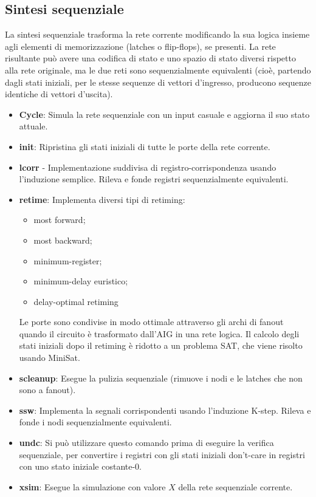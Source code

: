 \documentclass[
  italian,
]{book}
\providecommand{\tightlist}{%
  \setlength{\itemsep}{0pt}\setlength{\parskip}{0pt}}
\begin{document}
\newpage

\hypertarget{sintesi-sequenziale}{%
\subsection{Sintesi sequenziale}\label{sintesi-sequenziale}}

La sintesi sequenziale trasforma la rete corrente modificando la sua logica insieme agli elementi di memorizzazione (latches o flip-flops), se presenti. La rete risultante può avere una codifica di stato e uno spazio di stato diversi rispetto alla rete originale, ma le due reti sono sequenzialmente equivalenti (cioè, partendo dagli stati iniziali, per le stesse sequenze di vettori d'ingresso, producono sequenze identiche di vettori d'uscita).

\begin{itemize}
\tightlist
\item
  \textbf{Cycle}: Simula la rete sequenziale con un input casuale e aggiorna il suo stato attuale.
\item
  \textbf{init}: Ripristina gli stati iniziali di tutte le porte della rete corrente.
\item
  \textbf{lcorr} - Implementazione suddivisa di registro-corrispondenza usando l'induzione semplice. Rileva e fonde registri sequenzialmente equivalenti.
\item
  \textbf{retime}: Implementa diversi tipi di retiming:

  \begin{itemize}
  \tightlist
  \item
    most forward;
  \item
    most backward;
  \item
    minimum-register;
  \item
    minimum-delay euristico;
  \item
    delay-optimal retiming \citep{ICCD_1997}
  \end{itemize}

  Le porte sono condivise in modo ottimale attraverso gli archi di fanout quando il circuito è trasformato dall'AIG in una rete logica. Il calcolo degli stati iniziali dopo il retiming è ridotto a un problema SAT, che viene risolto usando MiniSat.
\item
  \textbf{scleanup}: Esegue la pulizia sequenziale (rimuove i nodi e le latches che non sono a fanout).
\item
  \textbf{ssw}: Implementa la segnali corrispondenti usando l'induzione K-step. Rileva e fonde i nodi sequenzialmente equivalenti.
\item
  \textbf{undc}: Si può utilizzare questo comando prima di eseguire la verifica sequenziale, per convertire i registri con gli stati iniziali don't-care in registri con uno stato iniziale costante-0.
\item
  \textbf{xsim}: Esegue la simulazione con valore \(X\) della rete sequenziale corrente.
\end{itemize}
\end{document}
